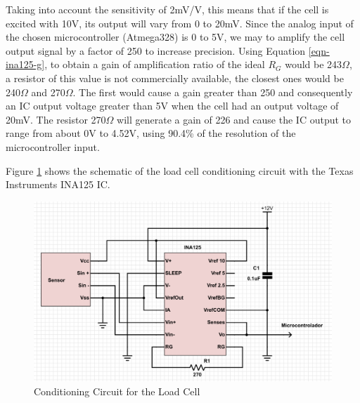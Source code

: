 		Taking into account the sensitivity of 2mV/V, this means that if the cell is excited with 10V, its output will vary from 0 to 20mV. Since the analog input of the chosen microcontroller (Atmega328) is 0 to 5V, we may to amplify the cell output signal by a factor of 250 to increase precision. Using Equation \ref{eqn-ina125-g}, to obtain a gain of amplification ratio of the ideal $R_{G}$ would be 243$\Omega$, a resistor of this value is not commercially available, the closest ones would be 240$\Omega$ and 270$\Omega$. The first would cause a gain greater than 250 and consequently an IC output voltage greater than 5V when the cell had an output voltage of 20mV. The resistor 270$\Omega$ will generate a gain of 226 and cause the IC output to range from about 0V to 4.52V, using 90.4\% of the resolution of the microcontroller input. 
		\par

		Figure \ref{fig-cic-cell} shows the schematic of the load cell conditioning circuit with the Texas Instruments INA125 IC.

		\begin{figure}[htbp]
			\centering
				\includegraphics[scale=0.35]{figuras/fig-cic-cell.png}
			\caption{Conditioning Circuit for the Load Cell}
			\label{fig-cic-cell}
		\end{figure}
